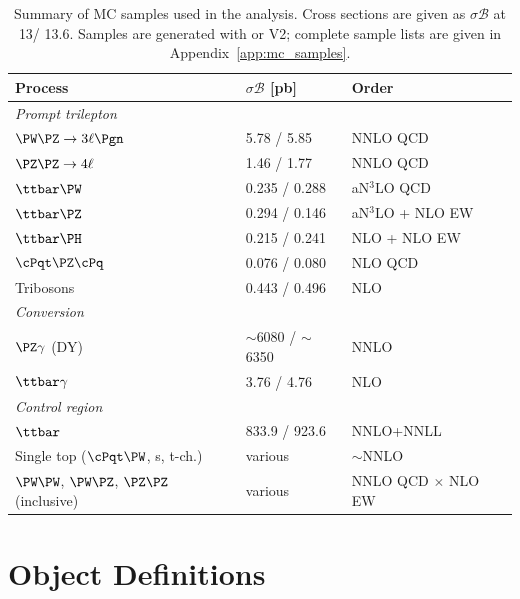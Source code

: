 \begin{table}[htbp]
\centering
\caption{Summary of MC samples used in the analysis. Cross sections are given as $\sigma\mathcal{B}$ at 13\TeV / 13.6\TeV. Samples are generated with \MGvATNLO or \POWHEG V2; complete sample lists are given in Appendix~\ref{app:mc_samples}.}
\label{tab:mc_summary}
\small
\begin{tabular}{p{4.2cm}p{3.2cm}l}
\hline\hline
Process & $\sigma\mathcal{B}$ [pb] & Order \\
\hline
\multicolumn{3}{l}{\textit{Prompt trilepton}} \\
$\PW\PZ \to 3\ell\Pgn$     & 5.78 / 5.85   & NNLO QCD \\
$\PZ\PZ \to 4\ell$          & 1.46 / 1.77   & NNLO QCD \\
$\ttbar\PW$                  & 0.235 / 0.288 & aN$^{3}$LO QCD \\
$\ttbar\PZ$                  & 0.294 / 0.146 & aN$^{3}$LO + NLO EW \\
$\ttbar\PH$                  & 0.215 / 0.241 & NLO + NLO EW \\
$\cPqt\PZ\cPq$              & 0.076 / 0.080 & NLO QCD \\
Tribosons                    & 0.443 / 0.496 & NLO \\
\hline
\multicolumn{3}{l}{\textit{Conversion}} \\
$\PZ\gamma$ (DY)             & $\sim$6080 / $\sim$6350 & NNLO \\
$\ttbar\gamma$               & 3.76 / 4.76   & NLO \\
\hline
\multicolumn{3}{l}{\textit{Control region}} \\
$\ttbar$                     & 833.9 / 923.6 & NNLO+NNLL \\
Single top ($\cPqt\PW$, s, t-ch.) & various & $\sim$NNLO \\
$\PW\PW$, $\PW\PZ$, $\PZ\PZ$ (inclusive) & various & NNLO QCD $\times$ NLO EW \\
\hline\hline
\end{tabular}
\end{table}



\section{Object Definitions}
\label{sec:objects}

